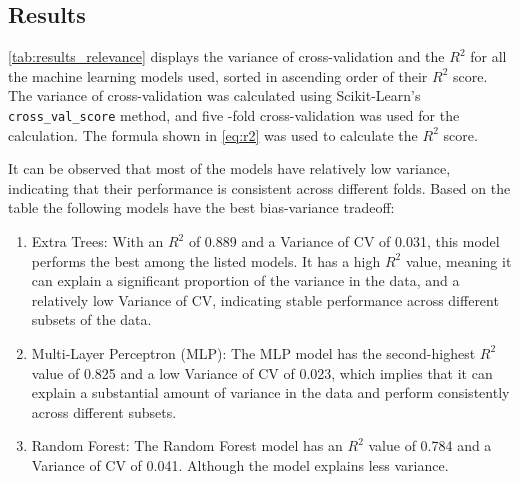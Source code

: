 \subsection{Results}\label{subsec:results3}

\cref*{tab:results_relevance} displays the variance of cross-validation and the $R^2$ for all the machine
learning models used, sorted in ascending order of their $R^2$ score.
The variance of cross-validation was calculated using Scikit-Learn's \texttt{cross\_val\_score} method, and five
-fold cross-validation was used for the calculation.
The formula shown in \cref{eq:r2} was used to calculate the $R^2$ score.

It can be observed that most of the models have relatively low variance, indicating that their performance is
consistent across different folds.
Based on the table the following models have the best bias-variance tradeoff:

\begin{enumerate}
    \item Extra Trees: With an $R^2$ of 0.889 and a Variance of CV of 0.031, this model performs the best among
    the listed models. It has a high $R^2$ value, meaning it can explain a significant proportion of the
    variance in the data, and a relatively low Variance of CV, indicating stable performance across different
    subsets of the data.
    \item Multi-Layer Perceptron (MLP): The MLP model has the second-highest $R^2$ value of 0.825 and a low Variance
    of CV of 0.023, which implies that it can explain a substantial amount of variance in the data and perform
    consistently across different subsets.
    \item Random Forest: The Random Forest model has an $R^2$ value of 0.784 and a Variance of CV of 0.041.
    Although the model explains less variance.
\end{enumerate}


